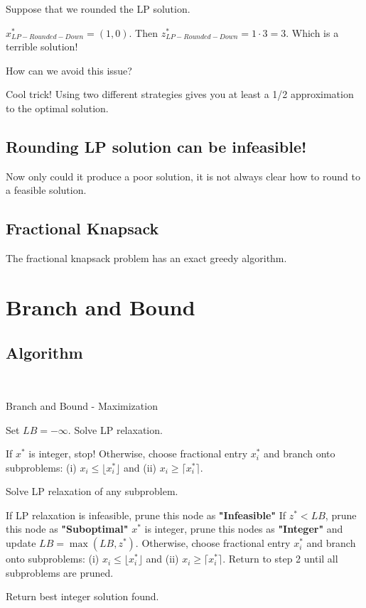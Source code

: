   Suppose that we rounded the LP solution.  
  
  $x^*_{LP-Rounded-Down} = (1,0)$.  Then $z^*_{LP-Rounded-Down} = 1\cdot 3 = 3$.  Which is a terrible solution!
  
  
  How can we avoid this issue?
  
  
  Cool trick!   Using two different strategies gives you at least a 1/2 approximation to the optimal solution.
  
  
  \subsection{Rounding LP solution can be infeasible!}
  Now only could it produce a poor solution, it is not always clear how to round to a feasible solution.  
  
\subsection{Fractional Knapsack}
The fractional knapsack problem has an exact greedy algorithm.

\section{Branch and Bound}


\subsection{Algorithm}


\begin{algorithm}[H]
\\
\caption{Branch and Bound - Maximization}\label{alg:branch-and-bound-max}
\begin{algorithmic}[1]
	\State Set $LB = - \infty$.
 	\State Solve LP relaxation. 
	\begin{algsubstates}
        		\State If $x^*$ is integer, stop!
        		\State Otherwise, choose fractional entry $x_i^*$ and branch onto subproblems:
		(i) $x_i \leq \lfloor x^*_i \rfloor$ and 
		(ii) $x_i \geq \lceil x^*_i \rceil$.    
	   \end{algsubstates}
	\State Solve LP relaxation of any subproblem.
		\begin{algsubstates}
		\State If LP relaxation is infeasible, prune this node as \textbf{"Infeasible"}
        		\State If $z^* < LB$, prune this node as \textbf{"Suboptimal"}
		\State $x^*$ is integer, prune this nodes as \textbf{"Integer"} and update $LB = \max(LB, z^*)$.
		\State Otherwise, choose fractional entry $x_i^*$ and branch onto subproblems:  (i) $x_i \leq \lfloor x^*_i \rfloor$ and (ii) $x_i \geq \lceil x^*_i \rceil$.     Return to step 2 until all subproblems are pruned.
      \end{algsubstates}
      \State Return best integer solution found.
	\end{algorithmic}
\end{algorithm}

